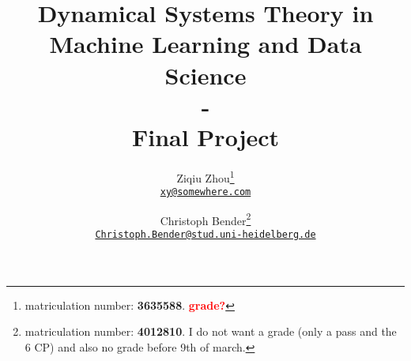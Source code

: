 \documentclass{scrarticle}
\title{\Huge Dynamical Systems Theory in Machine Learning and	Data Science\\\huge - \\Final Project}
\author{Ziqiu Zhou\footnote{matriculation number: \textbf{3635588}. \textcolor{red}{\textbf{grade?}}}\\\small \href{mailto:xy@somewhere.com}{\texttt{xy@somewhere.com}} \and  Christoph Bender\footnote{matriculation number: \textbf{4012810}. I do not want a grade (only a pass and the 6 CP) and also no grade before 9th of march.}\\\small \href{mailto:Christoph.Bender@stud.uni-heidelberg.de}{\texttt{Christoph.Bender@stud.uni-heidelberg.de}}}
\begin{document}
	\maketitle
	
	\clearpage
	
	\FloatBarrier
	
	\FloatBarrier
	
	\FloatBarrier
	\printbibliography
\end{document}
